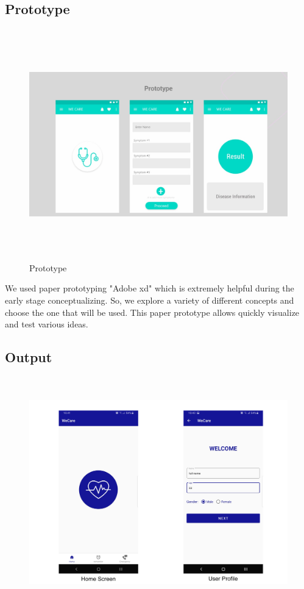 \subsection{Prototype}
\begin{figure}[H]
\begin{center}
\includegraphics[width=150mm, height = 100mm]{images/prototype.jpg}
\caption{Prototype}
\end{center}
\end{figure}
We used paper prototyping "Adobe xd" which is extremely helpful during the early stage conceptualizing. So, we explore a variety of different concepts and choose the one that will be used. This paper prototype allows quickly visualize and test various ideas.


\subsection{Output}


\begin{figure}[H]
\begin{center}
\includegraphics[width=145mm, height = 100mm]{Outputnew/1.png}
\caption{}
\end{center}
\end{figure}

